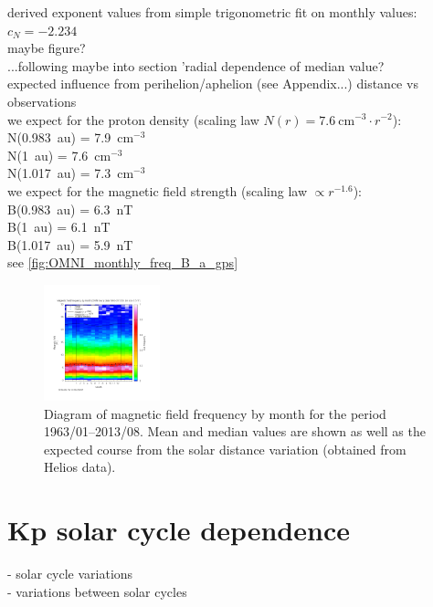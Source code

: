 derived exponent values from simple trigonometric fit on monthly values:\\
$c_N = -2.234$\\
maybe figure?\\

...following maybe into section 'radial dependence of median value?\\
expected influence from perihelion/aphelion (see Appendix...) distance vs observations\\
we expect for the proton density (scaling law $N(r) = 7.6~\text{cm}^{-3} \cdot r^{-2}$):\\
N(0.983~au) = 7.9~cm$^{-3}$\\
N(1~au) = 7.6~cm$^{-3}$\\
N(1.017~au) = 7.3~cm$^{-3}$\\
we expect for the magnetic field strength (scaling law $\propto r^{-1.6}$):\\
B(0.983~au) = 6.3~nT\\
B(1~au) = 6.1~nT\\
B(1.017~au) = 5.9~nT\\

see \autoref{fig:OMNI_monthly_freq_B_a_gps}
\begin{figure}[htb]
	\centering
	\includegraphics[width=0.3\textwidth]{images/gnuplots/OMNI_monthly_freq_B_a_gps.png}
	\caption{Diagram of magnetic field frequency by month for the period 1963/01--2013/08. Mean and median values are shown as well as the expected course from the solar distance variation (obtained from Helios data).}
	\label{fig:OMNI_monthly_freq_B_a_gps}
\end{figure}

\section{Kp solar cycle dependence}
- solar cycle variations\\
- variations between solar cycles\\

